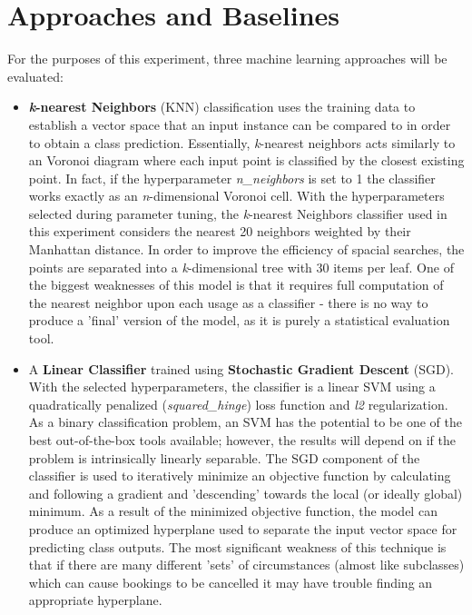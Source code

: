 \documentclass[10pt,conference]{IEEEtran}
\begin{document}
\section{Approaches and Baselines}
  For the purposes of this experiment, three machine learning approaches will be evaluated:
  \begin{itemize}
    \item \textbf{\emph{k}-nearest Neighbors} (KNN) classification uses the training data to establish a vector space that an input instance can be compared to in order to obtain a class prediction. Essentially, \emph{k}-nearest neighbors acts similarly to an Voronoi diagram where each input point is classified by the closest existing point. In fact, if the hyperparameter \emph{n\_neighbors} is set to 1 the classifier works exactly as an \emph{n}-dimensional Voronoi cell. With the hyperparameters selected during parameter tuning, the \emph{k}-nearest Neighbors classifier used in this experiment considers the nearest 20 neighbors weighted by their Manhattan distance. In order to improve the efficiency of spacial searches, the points are separated into a \emph{k}-dimensional tree with 30 items per leaf. One of the biggest weaknesses of this model is that it requires full computation of the nearest neighbor upon each usage as a classifier - there is no way to produce a 'final' version of the model, as it is purely a statistical evaluation tool.
    \item A \textbf{Linear Classifier} trained using \textbf{Stochastic Gradient Descent} (SGD). With the selected hyperparameters, the classifier is a linear SVM using a quadratically penalized (\emph{squared\_hinge}) loss function and \emph{l2} regularization. As a binary classification problem, an SVM has the potential to be one of the best out-of-the-box tools available; however, the results will depend on if the problem is intrinsically linearly separable. The SGD component of the classifier is used to iteratively minimize an objective function by calculating and following a gradient and 'descending' towards the local (or ideally global) minimum. As a result of the minimized objective function, the model can produce an optimized hyperplane used to separate the input vector space for predicting class outputs. The most significant weakness of this technique is that if there are many different 'sets' of circumstances (almost like subclasses) which can cause bookings to be cancelled it may have trouble finding an appropriate hyperplane.

\end{itemize}
\end{document}
